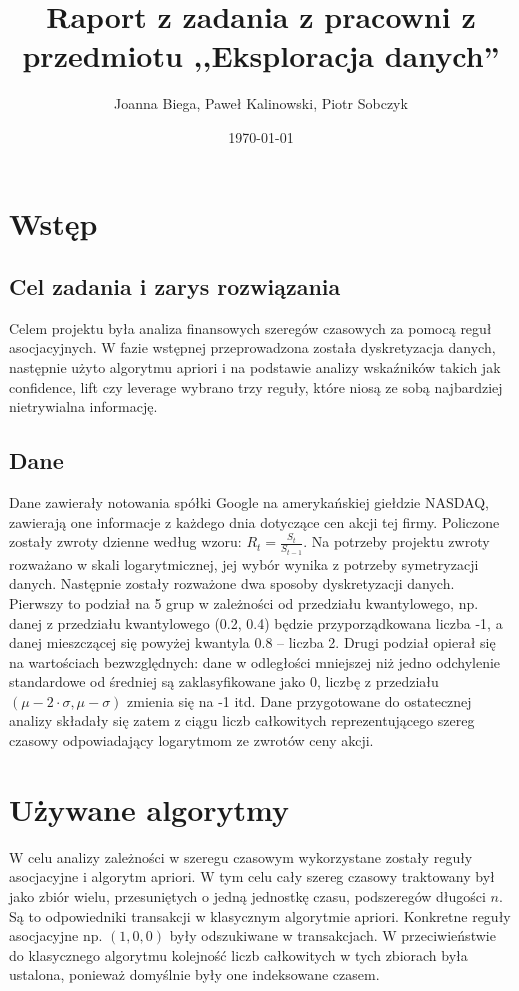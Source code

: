 \documentclass[a4paper,10pt]{article}
\title{Raport z zadania z pracowni z przedmiotu ,,Eksploracja danych''}
\date{\today}
\author{Joanna Biega, Paweł Kalinowski, Piotr Sobczyk}
\begin{document}
\maketitle
\section{Wstęp}

\subsection{Cel zadania i zarys rozwiązania}
Celem projektu była analiza finansowych szeregów czasowych za pomocą reguł asocjacyjnych. W fazie wstępnej przeprowadzona została dyskretyzacja danych, następnie
użyto algorytmu apriori i na podstawie analizy wskaźników takich jak confidence, lift czy leverage wybrano trzy reguły, które niosą ze sobą najbardziej
nietrywialna informację.

\subsection{Dane}
Dane zawierały notowania spółki Google na amerykańskiej giełdzie 
NASDAQ, zawierają one informacje z każdego dnia dotyczące cen akcji tej firmy. Policzone zostały zwroty dzienne według wzoru: $R_t = \frac{S_t}{S_{t-1}}$.
Na potrzeby projektu zwroty rozważano w skali logarytmicznej, jej wybór wynika z potrzeby symetryzacji danych. 
Następnie zostały rozważone dwa sposoby dyskretyzacji danych. Pierwszy to podział na 5 grup w zależności od przedziału kwantylowego, 
np. danej z przedziału kwantylowego (0.2, 0.4) będzie przyporządkowana liczba -1, a danej mieszczącej się powyżej kwantyla 0.8 – liczba 2.
Drugi podział opierał się na wartościach bezwzględnych: dane w odległości mniejszej niż jedno odchylenie standardowe od średniej są zaklasyfikowane 
jako 0, liczbę z przedziału $(\mu - 2 \cdot \sigma, \mu - \sigma)$ zmienia się na -1 itd.
Dane przygotowane do ostatecznej analizy składały się zatem z ciągu liczb całkowitych reprezentującego szereg czasowy odpowiadający logarytmom ze zwrotów ceny akcji.

\section{Używane algorytmy}
W celu analizy zależności w szeregu czasowym wykorzystane zostały reguły asocjacyjne i algorytm apriori. W tym celu cały szereg czasowy traktowany był
 jako zbiór wielu, przesuniętych o jedną jednostkę czasu, podszeregów długości $n$. Są to odpowiedniki transakcji w klasycznym algorytmie apriori. 
Konkretne reguły asocjacyjne np. $(1,0,0)$ były odszukiwane w transakcjach. W przeciwieństwie do klasycznego algorytmu kolejność liczb całkowitych w tych
zbiorach była ustalona, ponieważ domyślnie były one indeksowane czasem.
\end{document}
